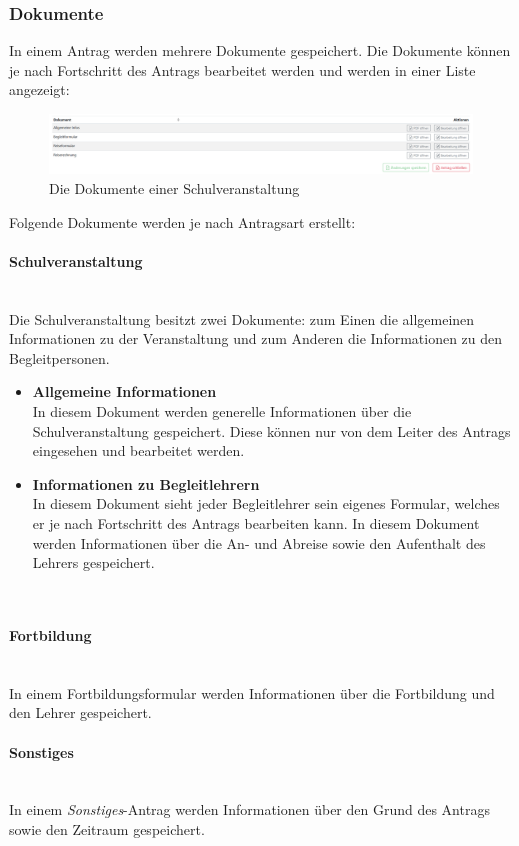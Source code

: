 \subsubsection{Dokumente}
In einem Antrag werden mehrere Dokumente gespeichert. Die Dokumente können je nach Fortschritt des Antrags bearbeitet werden und werden in einer Liste angezeigt:
\begin{figure}
	\centering
	\includegraphics[width=1\linewidth]{images/documents}
	\caption[Dokumente eines Antrags]{Die Dokumente einer Schulveranstaltung}
	\label{fig:documents}
\end{figure}

Folgende Dokumente werden je nach Antragsart erstellt:
\paragraph{Schulveranstaltung}~\\
Die Schulveranstaltung besitzt zwei Dokumente: zum Einen die allgemeinen Informationen zu der Veranstaltung und zum Anderen die Informationen zu den Begleitpersonen.
\begin{itemize}
	\item \textbf{Allgemeine Informationen}\\
	In diesem Dokument werden generelle Informationen über die Schulveranstaltung gespeichert. Diese können nur von dem Leiter des Antrags eingesehen und bearbeitet werden.
	\item \textbf{Informationen zu Begleitlehrern}\\
	In diesem Dokument sieht jeder Begleitlehrer sein eigenes Formular, welches er je nach Fortschritt des Antrags bearbeiten kann. In diesem Dokument werden Informationen über die An- und Abreise sowie den Aufenthalt des Lehrers gespeichert.
\end{itemize}
\newpage~
\paragraph{Fortbildung}~\\
In einem Fortbildungsformular werden Informationen über die Fortbildung und den Lehrer gespeichert.
\paragraph{Sonstiges}~\\
In einem \textit{Sonstiges}-Antrag werden Informationen über den Grund des Antrags sowie den Zeitraum gespeichert.
